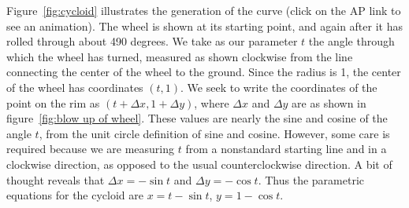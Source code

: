 \begin{solution}
Figure~\ref{fig:cycloid} illustrates the generation of the curve
(click on the AP link to see an animation). The wheel is shown at its
starting point, and again after it has rolled through about 490
degrees. We take as our parameter $t$ the angle through which the
wheel has turned, measured as shown clockwise from the line connecting
the center of the wheel to the ground. Since the radius is 1, the
center of the wheel has coordinates $(t,1)$. We seek to write the
coordinates of the point on the rim as $(t+\Delta x,1+\Delta y)$,
where $\Delta x$ and $\Delta y$ are as shown in figure~\ref{fig:blow
  up of wheel}. These values are nearly the sine and cosine of the
angle $t$, from the unit circle definition of sine and
cosine. However, some care is required because we are measuring $t$
from a nonstandard starting line and in a clockwise direction, as
opposed to the usual counterclockwise direction. A bit of thought
reveals that $\Delta x=-\sin t$ and $\Delta y=-\cos t$. Thus the
parametric equations for the cycloid are $x=t-\sin t$, $y=1-\cos t$.
\end{solution}

